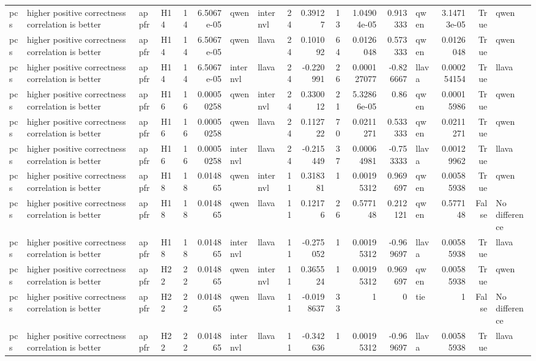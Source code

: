 \begin{longtable}{llllrrllrrrrrlrrl}
pcs & higher positive correctness correlation is better & appfr & H14 & 14 & 6.5067e-05 & qwen & internvl & 24 & 0.39127 & 13 & 1.04904e-05 & 0.913333 & qwen & 3.14713e-05 & True & qwen \\
pcs & higher positive correctness correlation is better & appfr & H14 & 14 & 6.5067e-05 & qwen & llava & 24 & 0.101092 & 64 & 0.0126048 & 0.573333 & qwen & 0.0126048 & True & qwen \\
pcs & higher positive correctness correlation is better & appfr & H14 & 14 & 6.5067e-05 & internvl & llava & 24 & -0.220991 & 26 & 0.000127077 & -0.826667 & llava & 0.000254154 & True & llava \\
pcs & higher positive correctness correlation is better & appfr & H16 & 16 & 0.00050258 & qwen & internvl & 24 & 0.330012 & 21 & 5.32866e-05 & 0.86 & qwen & 0.00015986 & True & qwen \\
pcs & higher positive correctness correlation is better & appfr & H16 & 16 & 0.00050258 & qwen & llava & 24 & 0.112722 & 70 & 0.0211271 & 0.533333 & qwen & 0.0211271 & True & qwen \\
pcs & higher positive correctness correlation is better & appfr & H16 & 16 & 0.00050258 & internvl & llava & 24 & -0.215449 & 37 & 0.00064981 & -0.753333 & llava & 0.00129962 & True & llava \\
pcs & higher positive correctness correlation is better & appfr & H18 & 18 & 0.014865 & qwen & internvl & 11 & 0.318381 & 1 & 0.00195312 & 0.969697 & qwen & 0.00585938 & True & qwen \\
pcs & higher positive correctness correlation is better & appfr & H18 & 18 & 0.014865 & qwen & llava & 11 & 0.12176 & 26 & 0.577148 & 0.212121 & qwen & 0.577148 & False & No difference \\
pcs & higher positive correctness correlation is better & appfr & H18 & 18 & 0.014865 & internvl & llava & 11 & -0.275052 & 1 & 0.00195312 & -0.969697 & llava & 0.00585938 & True & llava \\
pcs & higher positive correctness correlation is better & appfr & H22 & 22 & 0.014865 & qwen & internvl & 11 & 0.365524 & 1 & 0.00195312 & 0.969697 & qwen & 0.00585938 & True & qwen \\
pcs & higher positive correctness correlation is better & appfr & H22 & 22 & 0.014865 & qwen & llava & 11 & -0.0198637 & 33 & 1 & 0 & tie & 1 & False & No difference \\
pcs & higher positive correctness correlation is better & appfr & H22 & 22 & 0.014865 & internvl & llava & 11 & -0.342636 & 1 & 0.00195312 & -0.969697 & llava & 0.00585938 & True & llava \\

\end{longtable}

